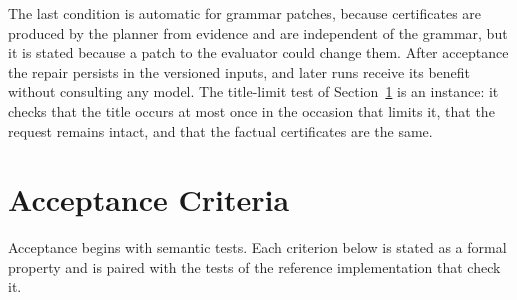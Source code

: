 \documentclass[11pt]{article}
\theoremstyle{definition}
\theoremstyle{remark}
\begin{document}
The last condition is automatic for grammar patches, because certificates are produced by the planner from evidence and are independent of the grammar, but it is stated because a patch to the evaluator could change them. After acceptance the repair persists in the versioned inputs, and later runs receive its benefit without consulting any model. The title-limit test of Section~\ref{sec:accept} is an instance: it checks that the title occurs at most once in the occasion that limits it, that the request remains intact, and that the factual certificates are the same.

\section{Acceptance Criteria}\label{sec:accept}

Acceptance begins with semantic tests. Each criterion below is stated as a formal property and is paired with the tests of the reference implementation that check it.
\end{document}
